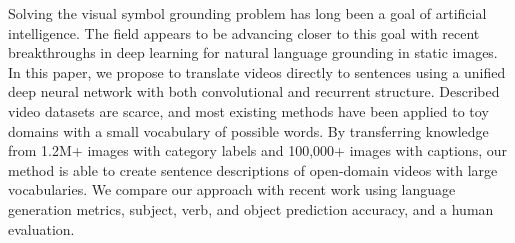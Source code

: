 Solving the visual symbol grounding problem has long been a goal of artificial intelligence. The field appears to be advancing closer to this goal with recent breakthroughs in deep learning for natural language grounding in static images. In this paper, we propose to translate videos directly to sentences using a unified deep neural network with both convolutional and recurrent structure. Described video datasets are scarce, and most existing methods have been applied to toy domains with a small vocabulary of possible words. By transferring knowledge from 1.2M+ images with category labels and 100,000+ images with captions, our method is able to create sentence descriptions of open-domain videos with large vocabularies. We compare our approach with recent work using language generation metrics, subject, verb, and object prediction accuracy, and a human evaluation.
